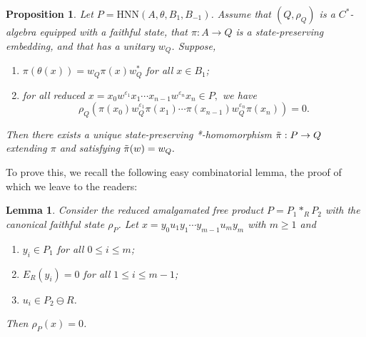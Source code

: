 \documentclass{amsart}
\newtheorem{lemma}[theorem]{Lemma}
\newtheorem{proposition}[theorem]{Proposition}
\theoremstyle{definition}
\begin{document}
\begin{proposition}\label{prop: hnn-univ-prop}
    Let $P = \mathrm{HNN}(A,\theta,B_1,B_{-1})$. Assume that $(Q,\rho_Q)$ is a $C^\ast$-algebra equipped with a faithful state, that $\pi: A \to Q$ is a state-preserving embedding, and that has a unitary $w_Q$. Suppose,
    \begin{enumerate}
        \item $\pi(\theta(x)) = w_Q\pi(x)w_Q^\ast$ for all $x\in B_1$;
        \item for all reduced $x = x_0w^{\varepsilon_1}x_1\cdots x_{n-1}w^{\varepsilon_n}x_n \in P,$ we have
        \begin{equation*}
            \rho_Q(\pi(x_0)w_Q^{\varepsilon_1}\pi(x_1)\cdots \pi(x_{n-1})w_Q^{\varepsilon_n}\pi(x_n)) = 0.
        \end{equation*}
    \end{enumerate}
    Then there exists a unique state-preserving *-homomorphism $\Tilde{\pi}:P\to Q$ extending $\pi$ and satisfying $\Tilde{\pi}(w) = w_Q.$
\end{proposition}

To prove this, we recall the following easy combinatorial lemma, the proof of which we leave to the readers:

\begin{lemma}\label{lem: amal-free-state-zero}
    Consider the reduced amalgamated free product $P = P_1 \ast_R P_2$ with the canonical faithful state $\rho_P$. Let $x = y_0u_1y_1 \cdots y_{m-1}u_my_m$ with $m \ge 1$ and
    \begin{enumerate}
        \item $y_i \in P_1$ for all $0 \le i \le m$;
        \item $E_R(y_i) = 0$ for all $1 \le i \le m - 1$;
        \item $u_i \in P_2 \ominus R$.
    \end{enumerate}
    Then $\rho_P(x) = 0$.
\end{lemma}
\end{document}
